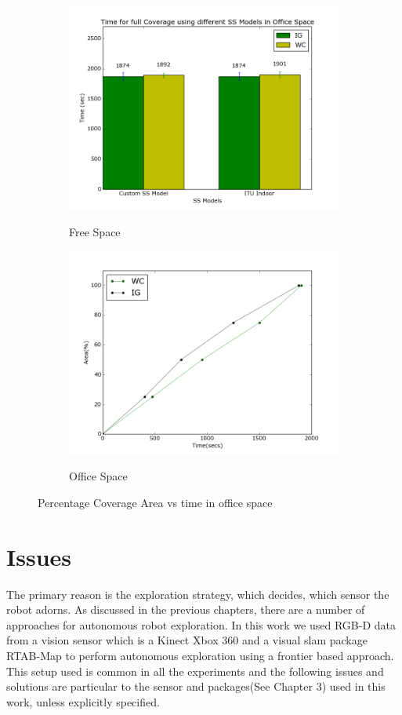 \begin{figure}[!h]
\centering
	\begin{subfigure}[b]{0.75\textwidth}
		\includegraphics[width=\textwidth]{images/bargoffice.png}
		\label{subfig:a}
		\caption{Free Space}
	\end{subfigure}
	\begin{subfigure}[b]{0.75\textwidth}
		\includegraphics[width=\textwidth]{images/60x30office.png}
		\label{subfig:b}
		\caption{Office Space}
	\end{subfigure}
\caption{Percentage Coverage Area vs time in office space}
\end{figure}

\section{Issues}
The primary reason is the exploration strategy, which decides, which sensor the robot adorns. As discussed in the previous chapters, there are a number of approaches for autonomous robot exploration. In this work we used RGB-D data from a vision sensor which is a Kinect Xbox 360 and a visual slam package RTAB-Map to perform autonomous exploration using a frontier based approach. This setup used is common in all the experiments and the following issues and solutions are particular to the sensor and packages(See Chapter 3) used in this work, unless explicitly specified.  

